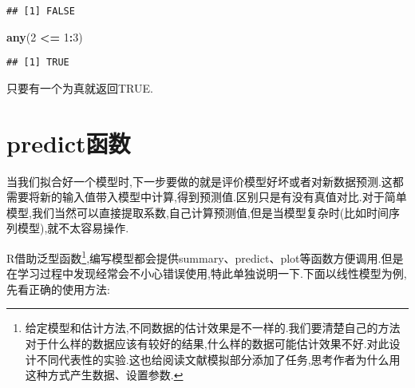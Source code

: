 \documentclass[]{ctexbook}
\newenvironment{Shaded}{\begin{snugshade}}{\end{snugshade}}
\newcommand{\DataTypeTok}[1]{\textcolor[rgb]{0.13,0.29,0.53}{#1}}
\newcommand{\DecValTok}[1]{\textcolor[rgb]{0.00,0.00,0.81}{#1}}
\newcommand{\KeywordTok}[1]{\textcolor[rgb]{0.13,0.29,0.53}{\textbf{#1}}}
\newcommand{\NormalTok}[1]{#1}
\newcommand{\OperatorTok}[1]{\textcolor[rgb]{0.81,0.36,0.00}{\textbf{#1}}}
\newcommand{\StringTok}[1]{\textcolor[rgb]{0.31,0.60,0.02}{#1}}
\begin{document}
\begin{verbatim}
## [1] FALSE
\end{verbatim}

\begin{Shaded}
\begin{Highlighting}[]
\KeywordTok{any}\NormalTok{(}\DecValTok{2} \OperatorTok{<=}\StringTok{ }\DecValTok{1}\OperatorTok{:}\DecValTok{3}\NormalTok{)}
\end{Highlighting}
\end{Shaded}

\begin{verbatim}
## [1] TRUE
\end{verbatim}

只要有一个为真就返回TRUE.

\hypertarget{predict}{%
\section{predict函数}\label{predict}}

当我们拟合好一个模型时,下一步要做的就是评价模型好坏或者对新数据预测.这都需要将新的输入值带入模型中计算,得到预测值.区别只是有没有真值对比.对于简单模型,我们当然可以直接提取系数,自己计算预测值,但是当模型复杂时(比如时间序列模型),就不太容易操作.

R借助泛型函数\footnote{给定模型和估计方法,不同数据的估计效果是不一样的.我们要清楚自己的方法对于什么样的数据应该有较好的结果,什么样的数据可能估计效果不好.对此设计不同代表性的实验.这也给阅读文献模拟部分添加了任务,思考作者为什么用这种方式产生数据、设置参数.},编写模型都会提供summary、predict、plot等函数方便调用.但是在学习过程中发现经常会不小心错误使用,特此单独说明一下.下面以线性模型为例,先看正确的使用方法:

\begin{Shaded}
\end{Shaded}
\end{document}
